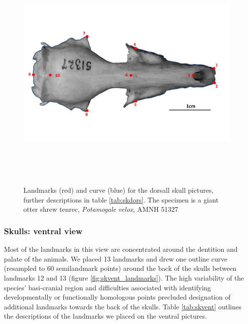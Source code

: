\documentclass[12pt,a4paper]{article}
\begin{document}
	\begin{figure}[H] 
 	\centering
  	\includegraphics[width=12cm, height=12cm, keepaspectratio=true]
  	{figures/AMNH_51327_dorsallandmarksdiagram.png}    
    \caption {Landmarks (red) and curve (blue) for the dorsall skull pictures, further descriptions in table \ref{tab:skdors}. The specimen is a giant otter shrew tenrec, \textit{Potamogale velox}, AMNH 51327}
  	\label{fig:skdors_landmarks}
  	\end{figure}

	\begin{table}[h]			
	\centering
	\caption{Descriptions of the landmarks (points) and curves (semilandmarks) for the skulls in dorsal view (see Figure \ref{fig:skdors_landmarks}).}
	 
	\label{tab:skdors}  
	\end{table}

\subsubsection{Skulls: ventral view}
	Most of the landmarks in this view are concentrated around the dentition and palate of the animals. We placed 13 landmarks and drew one outline curve (resampled to 60 semilandmark points) around the back of the skulls between landmarks 12 and 13 (figure \ref{fig:skvent_landmarks}). The high variability of the species’ basi-cranial region and difficulties associated with identifying developmentally or functionally homologous points precluded designation of additional landmarks towards the back of the skulls. Table \ref{tab:skvent} outlines the descriptions of the landmarks we placed on the ventral pictures.
\end{document}
